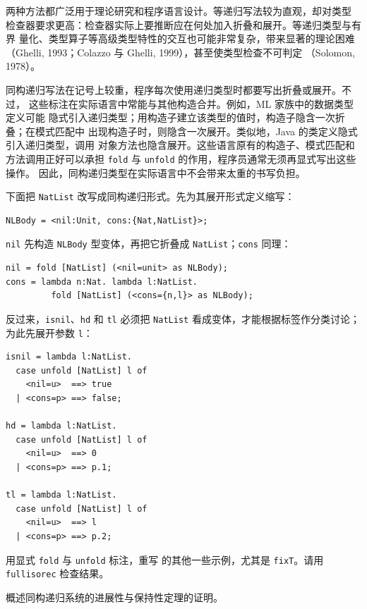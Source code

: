 两种方法都广泛用于理论研究和程序语言设计。等递归写法较为直观，却对类型
检查器要求更高：检查器实际上要推断应在何处加入折叠和展开。等递归类型与有界
量化、类型算子等高级类型特性的交互也可能非常复杂，带来显著的理论困难
（Ghelli, 1993；Colazzo 与 Ghelli, 1999），甚至使类型检查不可判定
（Solomon, 1978）。

同构递归写法在记号上较重，程序每次使用递归类型时都要写出折叠或展开。不过，
这些标注在实际语言中常能与其他构造合并。例如，ML 家族中的数据类型定义可能
隐式引入递归类型；用构造子建立该类型的值时，构造子隐含一次折叠；在模式匹配中
出现构造子时，则隐含一次展开。类似地，Java 的类定义隐式引入递归类型，调用
对象方法也隐含展开。这些语言原有的构造子、模式匹配和方法调用正好可以承担
\texttt{fold} 与 \texttt{unfold} 的作用，程序员通常无须再显式写出这些操作。
因此，同构递归类型在实际语言中不会带来太重的书写负担。

下面把 \texttt{NatList} 改写成同构递归形式。先为其展开形式定义缩写：
\begin{lstlisting}
NLBody = <nil:Unit, cons:{Nat,NatList}>;
\end{lstlisting}
\texttt{nil} 先构造 \texttt{NLBody} 型变体，再把它折叠成
\texttt{NatList}；\texttt{cons} 同理：
\begin{lstlisting}
nil = fold [NatList] (<nil=unit> as NLBody);
cons = lambda n:Nat. lambda l:NatList.
         fold [NatList] (<cons={n,l}> as NLBody);
\end{lstlisting}
反过来，\texttt{isnil}、\texttt{hd} 和 \texttt{tl} 必须把
\texttt{NatList} 看成变体，才能根据标签作分类讨论；为此先展开参数
\texttt{l}：
\begin{lstlisting}
isnil = lambda l:NatList.
  case unfold [NatList] l of
    <nil=u>  ==> true
  | <cons=p> ==> false;

hd = lambda l:NatList.
  case unfold [NatList] l of
    <nil=u>  ==> 0
  | <cons=p> ==> p.1;

tl = lambda l:NatList.
  case unfold [NatList] l of
    <nil=u>  ==> l
  | <cons=p> ==> p.2;
\end{lstlisting}

\begin{exercise}
\label{ex:20.2.1}
用显式 \texttt{fold} 与 \texttt{unfold} 标注，重写
的其他一些示例，尤其是 \texttt{fixT}。请用
\texttt{fullisorec} 检查结果。
\end{exercise}

\begin{exercise}[\(\star\star\), \(\nrightarrow\)]
\label{ex:20.2.2}
概述同构递归系统的进展性与保持性定理的证明。
\end{exercise}

